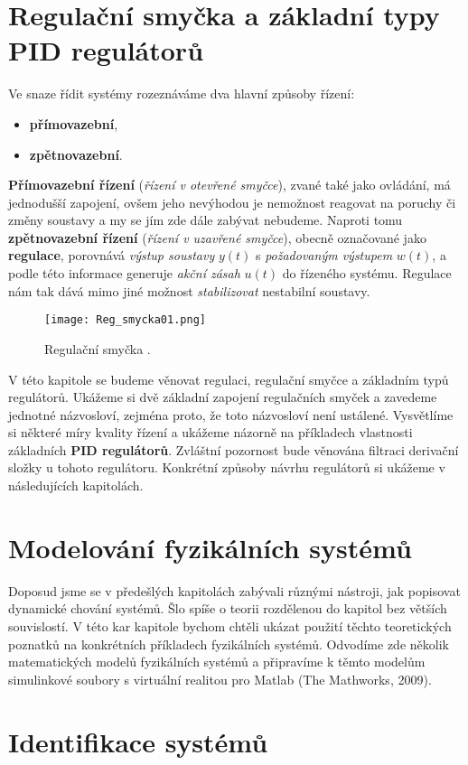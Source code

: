   \section{Regulační smyčka a základní typy PID regulátorů}\label{TKY:sec001}
    Ve snaze řídit systémy rozeznáváme dva hlavní způsoby řízení:
      \begin{itemize}
        \item \textbf{přímovazební},
        \item \textbf{zpětnovazební}.
      \end{itemize}
    \textbf{Přímovazební řízení} (\emph{řízení v otevřené smyčce}), zvané také jako ovládání, má 
    jednodušší zapojení, ovšem jeho nevýhodou je nemožnost reagovat na poruchy či změny soustavy a 
    my se jím zde dále zabývat nebudeme. Naproti tomu \textbf{zpětnovazební řízení} (\emph{řízení v 
    uzavřené smyčce}), obecně označované jako \textbf{regulace}, porovnává \emph{výstup soustavy} 
    \(y(t)\) s \emph{požadovaným výstupem} \(w(t)\), a podle této informace generuje \emph{akční 
    zásah} \(u(t)\) do řízeného systému. Regulace nám tak dává mimo jiné možnost 
    \emph{stabilizovat} nestabilní soustavy.

    \begin{figure}[ht!] %
      \centering
      \texttt{[image: Reg\_smycka01.png]}
      \caption{Regulační smyčka \cite[s.~215]{Roubal2011}.}
      \label{tky:fig_feedback003}
    \end{figure}
    V této kapitole se budeme věnovat regulaci, regulační smyčce a základním typů regulátorů. 
    Ukážeme si dvě základní zapojení regulačních smyček a zavedeme jednotné názvosloví, zejména 
    proto, že toto názvosloví není ustálené. Vysvětlíme si některé míry kvality řízení a ukážeme 
    názorně na příkladech vlastnosti základních \textbf{PID regulátorů}. Zvláštní pozornost bude 
    věnována filtraci derivační složky u tohoto regulátoru. Konkrétní způsoby návrhu regulátorů si 
    ukážeme v následujících kapitolách.
    
  
  \section{Modelování fyzikálních systémů}\label{TKY:sec002}
    Doposud jsme se v předešlých kapitolách zabývali různými nástroji, jak popisovat dynamické 
    chování systémů. Šlo spíše o teorii rozdělenou do kapitol bez větších souvislostí. V této kar 
    kapitole bychom chtěli ukázat použití těchto teoretických poznatků na konkrétních příkladech 
    fyzikálních systémů. Odvodíme zde několik matematických modelů fyzikálních systémů a připravíme 
    k těmto modelům simulinkové soubory s virtuální realitou pro Matlab (The Mathworks, 2009).
    
  \section{Identifikace systémů}\label{TKY:sec003}
    
\printbibliography[title={Seznam literatury}, heading=subbibliography]
